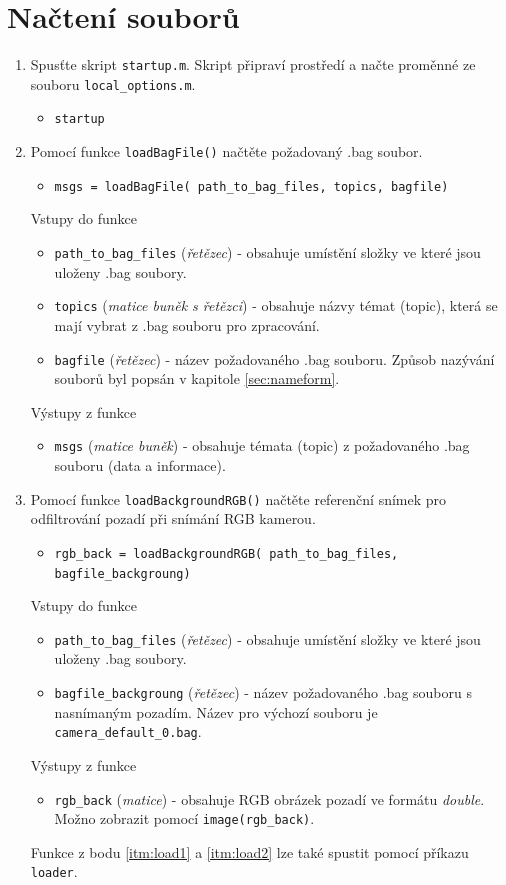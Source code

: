 \documentclass[10pt,a4paper,titlepage,oneside]{report}
\begin{document}
\section{Načtení souborů}
\begin{enumerate}
  \item Spusťte skript \verb|startup.m|. Skript připraví prostředí a načte proměnné ze souboru \verb|local_options.m|.
    \begin{itemize}
  	\item \verb|startup|
  \end{itemize}
  \item Pomocí funkce \verb|loadBagFile()| načtěte požadovaný .bag soubor.
	\label{itm:load1}    
    \begin{itemize}
  	\item \verb|msgs = loadBagFile( path_to_bag_files, topics, bagfile)|
    \end{itemize}
    		Vstupy do funkce
        		\begin{itemize}
  			\item \verb|path_to_bag_files| (\textit{řetězec}) - obsahuje umístění složky ve které jsou uloženy .bag soubory.
  			\item \verb|topics| (\textit{matice buněk s řetězci}) - obsahuje názvy témat (topic), která se mají vybrat z .bag souboru pro zpracování.
  			\item \verb|bagfile| (\textit{řetězec}) - název požadovaného .bag souboru. Způsob nazývání souborů byl popsán v kapitole \ref{sec:nameform}.
    			\end{itemize}
    		Výstupy z funkce
        		\begin{itemize}
  			\item \verb|msgs| (\textit{matice buněk}) - obsahuje témata (topic) z požadovaného .bag souboru (data a informace).
    			\end{itemize}
    \item Pomocí funkce \verb|loadBackgroundRGB()| načtěte referenční snímek pro odfiltrování pozadí při snímání RGB kamerou.
	\label{itm:load2} 
    \begin{itemize}
  	\item \verb|rgb_back = loadBackgroundRGB( path_to_bag_files, bagfile_backgroung)|
    \end{itemize}
    		Vstupy do funkce
        		\begin{itemize}
  			\item \verb|path_to_bag_files| (\textit{řetězec}) - obsahuje umístění složky ve které jsou uloženy .bag soubory.
  			\item \verb|bagfile_backgroung| (\textit{řetězec}) - název požadovaného .bag souboru s nasnímaným pozadím. Název pro výchozí souboru je \verb|camera_default_0.bag|.
    			\end{itemize}
    		Výstupy z funkce
        		\begin{itemize}
  			\item \verb|rgb_back| (\textit{matice}) - obsahuje RGB obrázek pozadí ve formátu \textit{double}. Možno zobrazit pomocí \verb|image(rgb_back)|.
    			\end{itemize}
Funkce z bodu \ref{itm:load1} a \ref{itm:load2} lze také spustit pomocí příkazu \verb|loader|.   
\end{enumerate}
\end{document}
